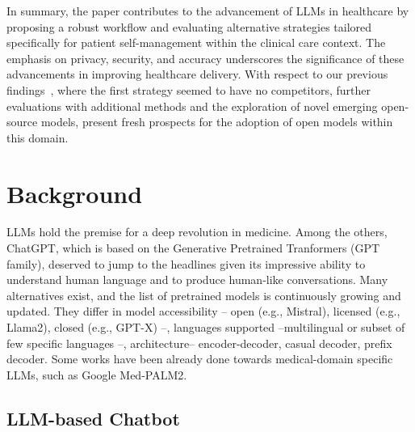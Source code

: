

In summary, the paper contributes to the advancement of LLMs in healthcare by proposing a robust workflow and evaluating alternative strategies tailored specifically for patient self-management within the clinical care context.
%
The emphasis on privacy, security, and accuracy underscores the significance of these advancements in improving healthcare delivery.
%
With respect to our previous findings~\cite{MontagnaTELMED2024}, where the first strategy seemed to have no competitors, further evaluations with additional methods and the exploration of novel emerging open-source models, present fresh prospects for the adoption of open models within this domain. 
%



\section{Background}\label{sec:back}

LLMs hold the premise for a deep revolution in medicine. 
%
Among the others, ChatGPT, which is based on the Generative Pretrained Tranformers (GPT family), deserved to jump to the headlines given its impressive ability to understand human language and to produce human-like conversations.
%
Many alternatives exist, and the list of pretrained models is continuously growing and updated.
%
They differ in model accessibility -- open (e.g., Mistral), licensed (e.g., Llama2), closed (e.g., GPT-X) --, languages supported --multilingual or subset of few specific languages --, architecture-- encoder-decoder, casual decoder, prefix decoder.
%
Some works have been already done towards medical-domain specific LLMs, such as Google Med-PALM2.

\subsection{LLM-based Chatbot}

